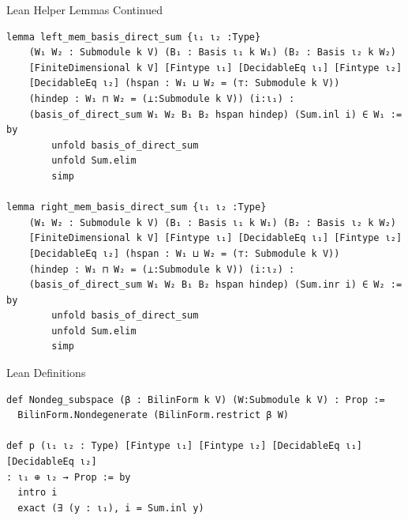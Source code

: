 \documentclass[svgnames]{beamer}
\begin{document}
\begin{frame}[label={sec:orthog_compl},fragile]{Lean Helper Lemmas Continued}

{\tiny

\begin{verbatim}
lemma left_mem_basis_direct_sum {ι₁ ι₂ :Type}
    (W₁ W₂ : Submodule k V) (B₁ : Basis ι₁ k W₁) (B₂ : Basis ι₂ k W₂) 
    [FiniteDimensional k V] [Fintype ι₁] [DecidableEq ι₁] [Fintype ι₂]  
    [DecidableEq ι₂] (hspan : W₁ ⊔ W₂ = (⊤: Submodule k V)) 
    (hindep : W₁ ⊓ W₂ = (⊥:Submodule k V)) (i:ι₁) :
    (basis_of_direct_sum W₁ W₂ B₁ B₂ hspan hindep) (Sum.inl i) ∈ W₁ := by
        unfold basis_of_direct_sum
        unfold Sum.elim
        simp

lemma right_mem_basis_direct_sum {ι₁ ι₂ :Type}
    (W₁ W₂ : Submodule k V) (B₁ : Basis ι₁ k W₁) (B₂ : Basis ι₂ k W₂) 
    [FiniteDimensional k V] [Fintype ι₁] [DecidableEq ι₁] [Fintype ι₂]  
    [DecidableEq ι₂] (hspan : W₁ ⊔ W₂ = (⊤: Submodule k V))
    (hindep : W₁ ⊓ W₂ = (⊥:Submodule k V)) (i:ι₂) :
    (basis_of_direct_sum W₁ W₂ B₁ B₂ hspan hindep) (Sum.inr i) ∈ W₂ := by
        unfold basis_of_direct_sum
        unfold Sum.elim
        simp
\end{verbatim}
}
\end{frame}

\begin{frame}[label={sec:orthog_compl},fragile]{Lean Definitions}

{\tiny

\begin{verbatim}
def Nondeg_subspace (β : BilinForm k V) (W:Submodule k V) : Prop :=
  BilinForm.Nondegenerate (BilinForm.restrict β W)

def p (ι₁ ι₂ : Type) [Fintype ι₁] [Fintype ι₂] [DecidableEq ι₁] [DecidableEq ι₂]
: ι₁ ⊕ ι₂ → Prop := by
  intro i
  exact (∃ (y : ι₁), i = Sum.inl y)
\end{verbatim}
}
\end{frame}
\end{document}
